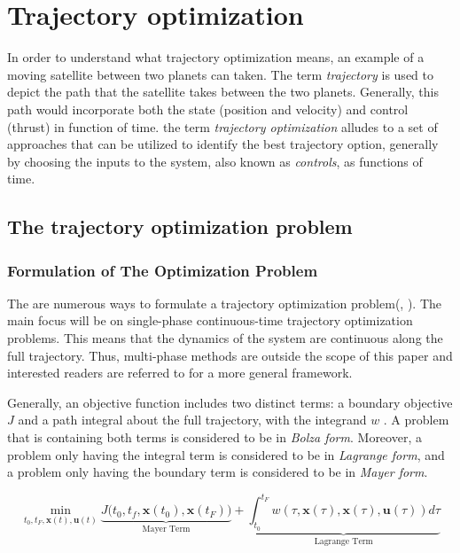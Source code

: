 \documentclass{thesisreport}
\begin{document}
 
\newpage

 \chapter{Trajectory optimization} 
  
 
 In order to understand what trajectory optimization means, an example of a moving satellite between two planets can taken.  The term \textit{trajectory} is used to depict the path that the satellite takes between the two planets. Generally, this path would incorporate both the state (position and velocity) and control (thrust) in function of time. the term \textit{trajectory optimization} alludes to a set of  approaches that can be utilized to identify the best trajectory option, generally by choosing the inputs to the system, also known as \textit{controls}, as functions of time.   
 
 \section{The trajectory optimization problem}

\subsection{Formulation of The Optimization Problem} 
 
 The are numerous ways to formulate a trajectory optimization problem(\cite{Betts1998}, \cite{Patterson2013}  \cite{Rao2009}). The main focus will be on single-phase continuous-time trajectory optimization problems. This means that the dynamics of the system are continuous along the full trajectory. Thus, multi-phase methods are outside the scope of this paper and interested readers are referred to \cite{Rao2009} for a more general framework.
 
 
\noindent Generally, an objective function includes two distinct terms: a boundary objective $J$ and a path integral about the full trajectory, with the integrand $w$ . A problem that is containing both terms is considered to be in \textit{Bolza form}. Moreover, a problem only having the integral term is considered to be in \textit{Lagrange form}, and a problem only having the boundary term is considered to be in \textit{Mayer form}. 
 

 
 
 
 
  \begin{equation}\label{trajectory_optimization_function}
 \min\limits_{t_0,t_F,\bm{x}(t),\bm{u}(t)} \underbrace{J \big(t_0,t_f,\bm{x}(t_0),\bm{x}(t_F)\big)}_\text{Mayer Term} + \underbrace{\int_{t_0}^{t_F} w(\tau, \bm{x}(\tau),\bm{x}(\tau),\bm{u}(\tau)) d \tau}_\text{Lagrange Term}
 \end{equation}
 
\end{document}
